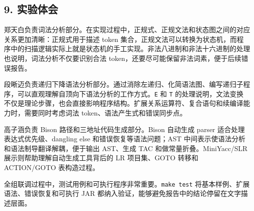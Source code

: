 \documentclass[
  a4paper,
  fontset=none,
]{ctexart}
\begin{document}
\hypertarget{ux5b9eux9a8cux4f53ux4f1a}{%
\subsection{9. 实验体会}\label{ux5b9eux9a8cux4f53ux4f1a}}

郑天白负责词法分析部分。在实现过程中，正规式、正规文法和状态图之间的对应关系更加清晰：正规式用于描述
token
集合，正规文法可以转换为状态机，而程序中的扫描逻辑实际上就是状态机的手工实现。非法八进制和非法十六进制的处理也说明，词法分析不仅要识别合法
token，还要尽可能保留非法词素，便于后续错误报告。

段晰迈负责递归下降语法分析部分。通过消除左递归、化简语法图、编写递归子程序，可以直观理解自顶向下语法分析的工作方式。\texttt{E\textquotesingle{}}
和 \texttt{T\textquotesingle{}}
的处理说明，文法变换不仅是理论步骤，也会直接影响程序结构。扩展关系运算符、复合语句和续编译能力时，需要同时考虑词法
token、语法产生式和错误同步点。

高子涵负责 Bison 路径和三地址代码生成部分。Bison 自动生成 parser
适合处理表达式优先级、dangling else 和错误恢复等语法问题；AST
中间表示使语法分析和语法制导翻译解耦，便于输出 AST、生成 TAC
和做常量折叠。MiniYacc/SLR 展示则帮助理解自动生成工具背后的 LR
项目集、GOTO 转移和 ACTION/GOTO 表构造过程。

全组联调过程中，测试用例和可执行程序非常重要。\texttt{make\ test}
将基本样例、扩展语法、错误恢复和可执行 JAR
都纳入验证，能够避免报告中的结论停留在文字描述层面。
\end{document}
